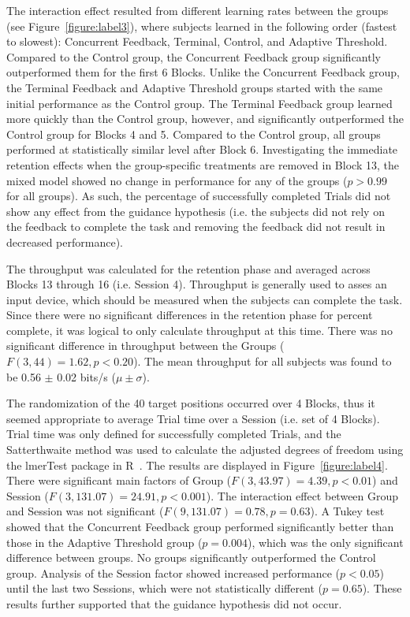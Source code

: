 The interaction effect resulted from different learning rates between the groups (see Figure~\ref{figure:label3}), where subjects learned in the following order (fastest to slowest): Concurrent Feedback, Terminal, Control, and Adaptive Threshold.
Compared to the Control group, the Concurrent Feedback group significantly outperformed them for the first 6 Blocks.
Unlike the Concurrent Feedback group, the Terminal Feedback and Adaptive Threshold groups started with the same initial performance as the Control group.
The Terminal Feedback group learned more quickly than the Control group, however, and significantly outperformed the Control group for Blocks 4 and 5.
Compared to the Control group, all groups performed at statistically similar level after Block 6.
Investigating the immediate retention effects when the group-specific treatments are removed in Block 13, the mixed model showed no change in performance for any of the groups ($p > 0.99$ for all groups).
As such, the percentage of successfully completed Trials did not show any effect from the guidance hypothesis (i.e. the subjects did not rely on the feedback to complete the task and removing the feedback did not result in decreased performance).

The throughput was calculated for the retention phase and averaged across Blocks 13 through 16 (i.e. Session 4).
Throughput is generally used to asses an input device, which should be measured when the subjects can complete the task.
Since there were no significant differences in the retention phase for percent complete, it was logical to only calculate throughput at this time.
There was no significant difference in throughput between the Groups ($F(3, 44) = 1.62, p < 0.20$).
The mean throughput for all subjects was found to be 0.56 $\pm$ 0.02 bits/s ($\mu\pm\sigma$).

The randomization of the 40 target positions occurred over 4 Blocks, thus it seemed appropriate to average Trial time over a Session (i.e. set of 4 Blocks).
Trial time was only defined for successfully completed Trials, and the Satterthwaite method was used to calculate the adjusted degrees of freedom using the lmerTest package in R~\citep{RN53}.
The results are displayed in Figure~\ref{figure:label4}.
There were significant main factors of Group ($F(3, 43.97) = 4.39, p < 0.01$) and Session ($F(3, 131.07) = 24.91, p < 0.001$).
The interaction effect between Group and Session was not significant ($F(9, 131.07) = 0.78, p = 0.63$).
A Tukey test showed that the Concurrent Feedback group performed significantly better than those in the Adaptive Threshold group ($p = 0.004$), which was the only significant difference between groups.
No groups significantly outperformed the Control group.
Analysis of the Session factor showed increased performance ($p < 0.05$) until the last two Sessions, which were not statistically different ($p = 0.65$).
These results further supported that the guidance hypothesis did not occur.

